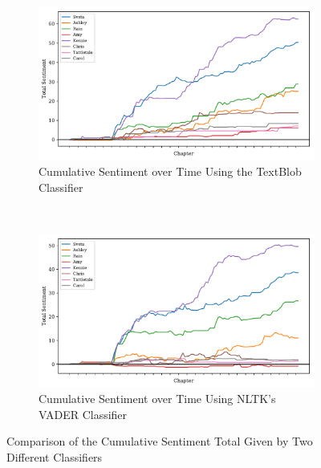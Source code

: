 \documentclass[11pt]{article}
\begin{document}
\begin{figure}[H]
\centering
\begin{subfigure}[t]{0.45\textwidth}
\centering
\includegraphics[width=\textwidth]{Full Graphs/total_sent_scores.pdf}
\caption{Cumulative Sentiment over Time Using the TextBlob Classifier}
\label{sent_compare_1}
\end{subfigure}
~
\begin{subfigure}[t]{0.45\textwidth}
\centering
\includegraphics[width=\textwidth]{Full Graphs v2/total_sent_scores.pdf}
\caption{Cumulative Sentiment over Time Using NLTK's VADER Classifier}
\label{sent_compare_2}
\end{subfigure}
\caption{Comparison of the Cumulative Sentiment Total Given by Two Different Classifiers}
\label{sent_anal_comparison}
\end{figure}
\end{document}
